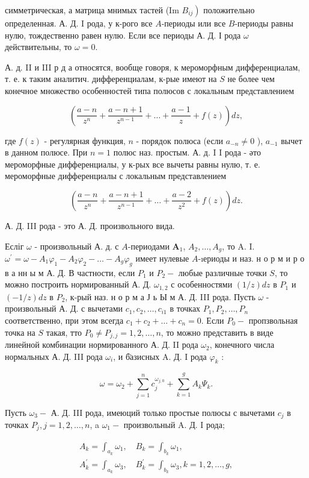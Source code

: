 \documentclass[10pt]{article}
\begin{document}
симметрическая, а матрица мнимых тастей (Im $\left.B_{i j}\right)$ положительно определенная. А. Д. I рода, у к-рого все $A$-периоды или все $B$-периоды равны нулю, тождественно равен нулю. Если все периоды А. Д. І рода $\omega$ действительны, то $\omega=0$.

А. д. II и III р д а относятся, вообще говоря, к мероморфным дифференциалам, т. е. к таким аналитич. дифференциалам, к-рые имеют на $S$ не более чем конечное множество особенностей типа полюсов с локальным представлением

\[
\left(\frac{a-n}{z^{n}}+\frac{a-n+1}{z^{n-1}}+\ldots+\frac{a-1}{z}+f(z)\right) d z,
\]

где $f(z)$ - регулярная функция, $n$ - порядок полюса (если $a_{-n} \neq 0$ ), $a_{-1}$ вычет в данном полюсе. При $n=1$ полюс наз. простым. А. д. I I рода - әто мероморфные дифференциалы, у к-рых все вычеты равны нулю, т. е. мероморфные дифференциалы с локальным представлением

\[
\left(\frac{a-n}{z^{n}}+\frac{a-n+1}{z^{n-1}}+\ldots+\frac{a-2}{z^{2}}+f(z)\right) d z .
\]

А. Д. III рода - это А. Д. произвольного вида.

Есліг $\omega$ - произвольный А. д. с $A$-периодами $\boldsymbol{A}_{1}$, $A_{2}, \ldots, A_{g}$, то A. I. $\omega^{\prime}=\omega-A_{1} \varphi_{1}-A_{2} \varphi_{2}-\ldots-A_{g} \varphi_{g}$ имеет нулевые $A$-ıериоды и наз. н о р м и р о в а нн ы м А. Д. В частности, если $P_{1}$ и $P_{2}-$ любые различные точки $S$, то можно построить нормированный А. Д. $\omega_{1,2}$ с особенностями $(1 / z) d z$ в $P_{1}$ и $(-1 / z) d z$ в $P_{2}$, к-рый наз. н о р м а Ј ь Ы м А. Д. III рода. Пусть $\omega$ - произвольный А. Д. с вычетами $c_{1}, c_{2}, \ldots, c_{i 1}$ в точках $P_{1}, P_{2}, \ldots, P_{n}$ соответственно, при этом всегда $c_{1}+c_{2}+\ldots+c_{n}=0$. Если $P_{0}-$ пропзвольная точка на $S$ такая, тто $P_{0} \neq P_{j, j}=1,2, \ldots, n$, то можно представить в виде линейной комбинации нормированного А. Д. II рода $\omega_{2}$, конечного числа нормальных А. Д. III рода $\omega_{i}$, и б̈азисных A. Д. I рода $\varphi_{k}$ :

\[
\omega=\omega_{2}+\sum_{j=1}^{n} c_{j}^{\omega_{j, 0}}+\sum_{k=1}^{g} A_{k} \Psi_{k} .
\]

Пусть $\omega_{3}-$ А. Д. III рода, имеюций только простые полюсы с вычетами $c_{j}$ в точках $P_{j}, j=1,2, \ldots, n$, a $\omega_{1}-$ произвольный A. Д. I рода;

\[
\begin{gathered}
A_{k}=\int_{a_{k}} \omega_{1}, \quad B_{k}=\int_{b_{k}} \omega_{1}, \\
A_{k}^{\prime}=\int_{a_{k}} \omega_{3}, \quad B_{k}^{\prime}=\int_{b_{k}} \omega_{3}, k=1,2, \ldots, g,
\end{gathered}
\]
\end{document}
